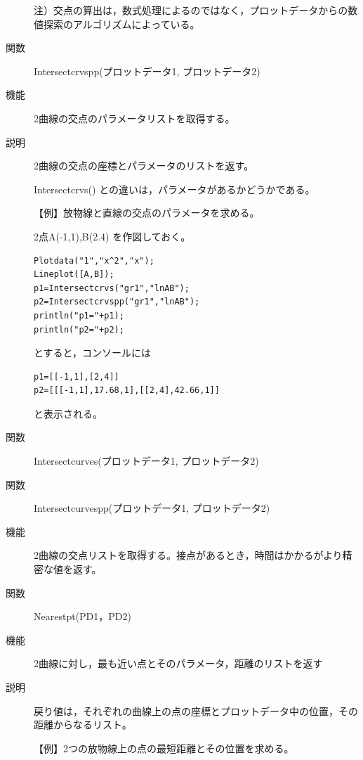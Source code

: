 \documentclass[papersize,a4paper,10pt,uplatex]{jsarticle}
\begin{document}
\begin{description}
\vspace{\baselineskip}
注）交点の算出は，数式処理によるのではなく，プロットデータからの数値探索のアルゴリズムによっている。

\vspace{\baselineskip}

\hypertarget{intersectcrvspp}{}
\item[関数]Intersectcrvspp(プロットデータ1, プロットデータ2)
\item[機能]2曲線の交点のパラメータリストを取得する。
\item[説明]2曲線の交点の座標とパラメータのリストを返す。

Intersectcrvs() との違いは，パラメータがあるかどうかである。

\vspace{\baselineskip}
【例】放物線と直線の交点のパラメータを求める。

2点A(-1,1),B(2.4) を作図しておく。
\begin{verbatim}
Plotdata("1","x^2","x");
Lineplot([A,B]);
p1=Intersectcrvs("gr1","lnAB");
p2=Intersectcrvspp("gr1","lnAB");
println("p1="+p1);
println("p2="+p2);
\end{verbatim}
とすると，コンソールには
\begin{verbatim}
p1=[[-1,1],[2,4]] 
p2=[[[-1,1],17.68,1],[[2,4],42.66,1]]
\end{verbatim}
と表示される。
\vspace{\baselineskip}

\hypertarget{intersectcurves}{}
\item[関数]Intersectcurves(プロットデータ1, プロットデータ2)
\item[関数]Intersectcurvespp(プロットデータ1, プロットデータ2)
\item[機能]2曲線の交点リストを取得する。接点があるとき，時間はかかるがより精密な値を返す。

\vspace{\baselineskip}

\hypertarget{nearestpt}{}
\item[関数]Nearestpt(PD1，PD2)
\item[機能]2曲線に対し，最も近い点とそのパラメータ，距離のリストを返す
\item[説明]戻り値は，それぞれの曲線上の点の座標とプロットデータ中の位置，その距離からなるリスト。

\vspace{\baselineskip}
【例】2つの放物線上の点の最短距離とその位置を求める。


\end{description}
\end{document}
